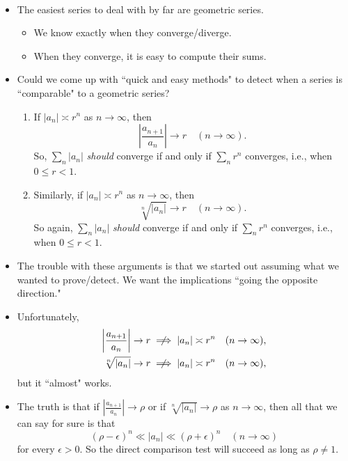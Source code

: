 \begin{remark}\,
\begin{itemize}
\item The easiest series to deal with by far are geometric series.
\begin{itemize}
\item We know exactly when they converge/diverge.
\item When they converge, it is easy to compute their sums.
\end{itemize}
\item Could we come up with ``quick and easy methods" to detect when a series is ``comparable" to a geometric series?
\begin{enumerate}
\item If $|a_n|\asymp r^n$ as $n\to\infty$, then
\begin{equation*}
\left|\frac{a_{n+1}}{a_n}\right| \to r\quad (n\to\infty).
\end{equation*}
So, $\sum_n |a_n|$ \textit{should} converge if and only if $\sum_n r^n$ converges, i.e., when $0\le r < 1$.
\item Similarly, if $|a_n|\asymp r^n$ as $n\to\infty$, then
\begin{equation*}
\sqrt[n]{|a_n|} \to r\quad (n\to\infty).
\end{equation*}
So again, $\sum_n |a_n|$ \textit{should} converge if and only if $\sum_n r^n$ converges, i.e., when $0\le r < 1$.
\end{enumerate}
\item The trouble with these arguments is that we started out assuming what we wanted to prove/detect.
We want the implications ``going the opposite direction."
\item Unfortunately,
\begin{align*}
\left|\frac{a_{n+1}}{a_n}\right|\to r &\centernot\implies |a_n|\asymp r^n \quad (n\to\infty),\\
\sqrt[n]{|a_n|}\to r &\centernot\implies |a_n|\asymp r^n \quad (n\to\infty),
\end{align*}
but it ``almost" works.
\item The truth is that if $\left|\frac{a_{n+1}}{a_n}\right|\to \rho$ or if $\sqrt[n]{|a_n|}\to \rho$ as $n\to\infty$, 
then all that we can say for sure is that
\begin{equation*}
(\rho-\epsilon)^n\ll |a_n|\ll (\rho+\epsilon)^n\quad (n\to\infty)
\end{equation*}
for every $\epsilon>0$.
So the direct comparison test will succeed as long as $\rho\ne 1$.
\end{itemize}
\end{remark}

